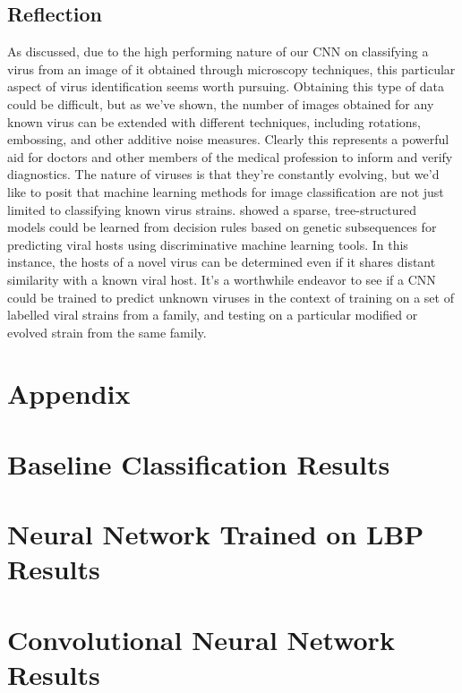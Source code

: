 \begin{multicols}{2}
\section{Reflection}
As discussed, due to the high performing nature of our CNN on classifying a virus from an image of it obtained through microscopy techniques, this particular aspect of virus identification seems worth pursuing. Obtaining this type of data could be difficult, but as we've shown, the number of images obtained for any known virus can be extended with different techniques, including rotations, embossing, and other additive noise measures. Clearly this represents a powerful aid for doctors and other members of the medical profession to inform and verify diagnostics. 
The nature of viruses is that they're constantly evolving, but we'd like to posit that machine learning methods for image classification are not just limited to classifying known virus strains. \citet{work_A} showed a sparse, tree-structured models could be learned from decision rules based on genetic subsequences for predicting viral hosts using discriminative machine learning tools. In this instance, the hosts of a novel virus can be determined even if it shares distant similarity with a known viral host.  It's a worthwhile endeavor to see if a CNN could be trained to predict unknown viruses in the context of training on a set of labelled viral strains from a family, and testing on a particular modified or evolved strain from the same family. 

\end{multicols}

\newpage
\section*{Appendix}
\appendix
\section{Baseline Classification Results}


\newpage
\section{Neural Network Trained on LBP Results} \label{appendix:images}




\newpage
\section{Convolutional Neural Network Results}



